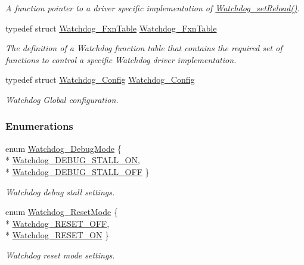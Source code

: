 \begin{DoxyCompactItemize}
\begin{DoxyCompactList}\small\item\em A function pointer to a driver specific implementation of \hyperlink{_watchdog_8h_a77ec81e1304fe05b77a9976e10e2d9a3}{Watchdog\+\_\+set\+Reload()}. \end{DoxyCompactList}\item 
typedef struct \hyperlink{struct_watchdog___fxn_table}{Watchdog\+\_\+\+Fxn\+Table} \hyperlink{_watchdog_8h_ad3e804ec79af5e10e8ef3af301860ef5}{Watchdog\+\_\+\+Fxn\+Table}
\begin{DoxyCompactList}\small\item\em The definition of a Watchdog function table that contains the required set of functions to control a specific Watchdog driver implementation. \end{DoxyCompactList}\item 
typedef struct \hyperlink{struct_watchdog___config}{Watchdog\+\_\+\+Config} \hyperlink{_watchdog_8h_ad8c9eb8a1cd2934965d385293fc38647}{Watchdog\+\_\+\+Config}
\begin{DoxyCompactList}\small\item\em Watchdog Global configuration. \end{DoxyCompactList}\end{DoxyCompactItemize}
\subsubsection*{Enumerations}
\begin{DoxyCompactItemize}
\item 
enum \hyperlink{_watchdog_8h_ab1aa5862661c88a16b9d7bc12709d51e}{Watchdog\+\_\+\+Debug\+Mode} \{ \\*
\hyperlink{_watchdog_8h_ab1aa5862661c88a16b9d7bc12709d51ea787c87976091a6f294070dadd1747ed0}{Watchdog\+\_\+\+D\+E\+B\+U\+G\+\_\+\+S\+T\+A\+L\+L\+\_\+\+O\+N}, 
\\*
\hyperlink{_watchdog_8h_ab1aa5862661c88a16b9d7bc12709d51ea745be9d89bc0c15eda5c4082020f8bb2}{Watchdog\+\_\+\+D\+E\+B\+U\+G\+\_\+\+S\+T\+A\+L\+L\+\_\+\+O\+F\+F}
 \}
\begin{DoxyCompactList}\small\item\em Watchdog debug stall settings. \end{DoxyCompactList}\item 
enum \hyperlink{_watchdog_8h_ada0db7216129d7dad494bb0cd0169f88}{Watchdog\+\_\+\+Reset\+Mode} \{ \\*
\hyperlink{_watchdog_8h_ada0db7216129d7dad494bb0cd0169f88a78ba6b49345f0116143f4d4e7a9ec488}{Watchdog\+\_\+\+R\+E\+S\+E\+T\+\_\+\+O\+F\+F}, 
\\*
\hyperlink{_watchdog_8h_ada0db7216129d7dad494bb0cd0169f88aafccd6330c396d9ffc2786524625bf1f}{Watchdog\+\_\+\+R\+E\+S\+E\+T\+\_\+\+O\+N}
 \}
\begin{DoxyCompactList}\small\item\em Watchdog reset mode settings. \end{DoxyCompactList}\end{DoxyCompactItemize}
